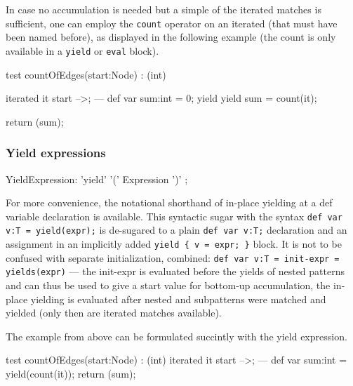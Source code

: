 In case no accumulation is needed but a simple  of the iterated matches is sufficient, one can employ the \texttt{count} operator on an iterated (that must have been named before), as displayed in the following example (the count is only available in a \texttt{yield} or \texttt{eval} block).

\begin{example}
  \begin{grgen}
test countOfEdges(start:Node) : (int)
{
	iterated it {
		start -->;
	} 
---
	def var sum:int = 0;
	yield {
		yield sum = count(it);
	}

	return (sum);
}
  \end{grgen}
\end{example}

\pagebreak

\subsubsection*{Yield expressions} 

\begin{rail} 
  YieldExpression: 'yield' '(' Expression ')' ;
\end{rail}

For more convenience, the notational shorthand of in-place yielding at a def variable declaration is available.
This syntactic sugar with the syntax \texttt{def var v:T = yield(expr);} is de-sugared to a plain \texttt{def var v:T;} declaration and an assignment in an implicitly added \verb#yield { v = expr; }# block.
It is not to be confused with separate initialization, combined: \texttt{def var v:T = init-expr = yields(expr)} --- the init-expr is evaluated before the yields of nested patterns and can thus be used to give a start value for bottom-up accumulation, the in-place yielding is evaluated after nested and subpatterns were matched and yielded (only then are iterated matches available).

The example from above can be formulated succintly with the yield expression.

\begin{example}
  \begin{grgen}
test countOfEdges(start:Node) : (int)
{
	iterated it {
		start -->;
	} 
---
	def var sum:int = yield(count(it));
	return (sum);
}
  \end{grgen}
\end{example}


